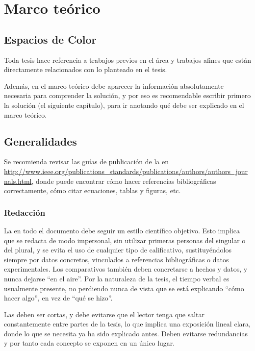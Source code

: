 \chapter{Marco teórico}
\label{ch:marco}

\section{Espacios de Color}

Toda tesis hace referencia a trabajos previos en el área y trabajos afines que
están directamente relacionados con lo planteado en el tesis.

Además, en el marco teórico debe aparecer la información absolutamente
necesaria para comprender la solución, y por eso es recomendable escribir
primero la solución (el siguiente capítulo), para ir anotando qué debe ser
explicado en el marco teórico.

\section{Generalidades}

Se recomienda revisar las guías de publicación de la  en
\url{http://www.ieee.org/publications_standards/publications/authors/authors_journals.html},
donde puede encontrar cómo hacer referencias bibliográficas correctamente, cómo
citar ecuaciones, tablas y figuras, etc.  

\subsection{Redacción}

La  en todo el documento debe seguir un estilo científico
objetivo. Esto implica que se redacta de modo impersonal, sin utilizar primeras
personas del singular o del plural, y se evita el uso de cualquier tipo de
calificativo, sustituyéndolos siempre por datos concretos, vinculados a
referencias bibliográficas o datos experimentales. Los comparativos también
deben concretarse a hechos y datos, y nunca dejarse ``en el aire''. Por la
naturaleza de la tesis, el tiempo verbal es usualmente presente, no perdiendo
nunca de vista que se está explicando ``cómo hacer algo'', en vez de ``qué se
hizo''.

Las  deben ser cortas, y debe evitarse que el lector tenga que saltar
constantemente entre partes de la tesis, lo que implica una exposición lineal
clara, donde lo que se necesita ya ha sido explicado antes. Deben evitarse
redundancias y por tanto cada concepto se exponen en un único lugar.

